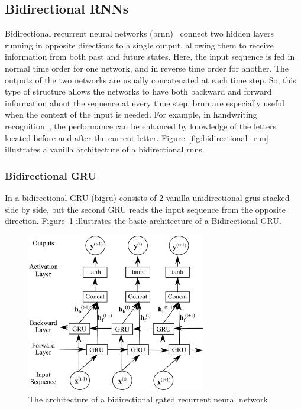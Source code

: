 \subsection{Bidirectional RNNs}
Bidirectional recurrent neural networks (\gls{brnn})~\cite{Schuster_97} connect two hidden layers running in opposite directions to a single output, allowing them to receive information from both past and future states. Here, the input sequence is fed in normal time order for one network, and in reverse time order for another. The outputs of the two networks are usually concatenated at each time step. So, this type of structure allows the networks to have both backward and forward information about the sequence at every time step. \gls{brnn} are especially useful when the context of the input is needed. For example, in handwriting recognition~\cite{Graves_08}, the performance can be enhanced by knowledge of the letters located before and after the current letter. Figure~\ref{fig:bidirectional_rnn} illustrates a vanilla architecture of a bidirectional \gls{rnn}s.


\subsubsection{Bidirectional GRU}
In a  bidirectional GRU (\gls{bigru}) consists of 2 vanilla unidirectional \gls{gru}s stacked side by side, but the second GRU reads the input sequence from the opposite direction. Figure~\ref{fig:bidirectional_gru} illustrates the basic architecture of a Bidirectional GRU. 
\begin{figure}[t]
	\centering
	\includegraphics[width=0.7\textwidth]{figures/bigru.eps}
	\caption{The architecture of a bidirectional gated recurrent neural network \label{fig:bidirectional_gru}}
\end{figure}




